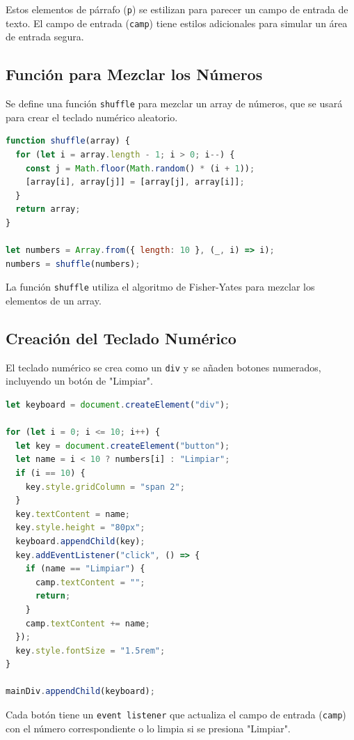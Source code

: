 Estos elementos de párrafo (\texttt{p}) se estilizan para parecer un campo de entrada de texto. El campo de entrada (\texttt{camp}) tiene estilos adicionales para simular un área de entrada segura.

\subsection*{Función para Mezclar los Números}

Se define una función \texttt{shuffle} para mezclar un array de números, que se usará para crear el teclado numérico aleatorio.

\begin{lstlisting}[language=JavaScript]
function shuffle(array) {
  for (let i = array.length - 1; i > 0; i--) {
    const j = Math.floor(Math.random() * (i + 1));
    [array[i], array[j]] = [array[j], array[i]];
  }
  return array;
}

let numbers = Array.from({ length: 10 }, (_, i) => i); 
numbers = shuffle(numbers); 
\end{lstlisting}

La función \texttt{shuffle} utiliza el algoritmo de Fisher-Yates para mezclar los elementos de un array.

\subsection*{Creación del Teclado Numérico}

El teclado numérico se crea como un \texttt{div} y se añaden botones numerados, incluyendo un botón de "Limpiar".

\begin{lstlisting}[language=JavaScript]
let keyboard = document.createElement("div");

for (let i = 0; i <= 10; i++) {
  let key = document.createElement("button");
  let name = i < 10 ? numbers[i] : "Limpiar"; 
  if (i == 10) {
    key.style.gridColumn = "span 2";
  }
  key.textContent = name;
  key.style.height = "80px";
  keyboard.appendChild(key);
  key.addEventListener("click", () => {
    if (name == "Limpiar") {
      camp.textContent = "";
      return;
    }
    camp.textContent += name;
  });
  key.style.fontSize = "1.5rem";
}

mainDiv.appendChild(keyboard);
\end{lstlisting}

Cada botón tiene un \texttt{event listener} que actualiza el campo de entrada (\texttt{camp}) con el número correspondiente o lo limpia si se presiona "Limpiar".

